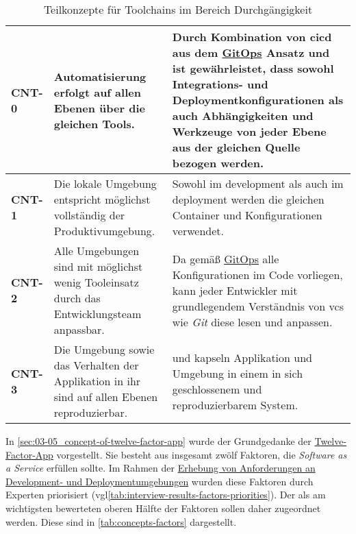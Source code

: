 \begin{table}[H]
    \begin{tabular}{ >{\bfseries\ttfamily}p{} >{}p{} | >{}p{} }
        CNT-0   &   Automatisierung erfolgt auf allen Ebenen über die gleichen Tools. &
        Durch Kombination von \Gls{cicd} aus dem \hyperref[sec:03-03_gitops]{GitOps} Ansatz und \nameref{sec:02-03_containerization} ist gewährleistet, dass sowohl Integrations- und Deploymentkonfigurationen als auch Abhängigkeiten und Werkzeuge von jeder Ebene aus der gleichen Quelle bezogen werden. \\
        \hline
        CNT-1   &   Die lokale Umgebung entspricht möglichst vollständig der Produktivumgebung. &
        Sowohl im \Gls{development} als auch im \Gls{deployment} werden die gleichen Container und Konfigurationen verwendet. \\
        \hline
        CNT-2   &   Alle Umgebungen sind mit möglichst wenig Tooleinsatz durch das Entwicklungsteam anpassbar. &
        Da gemäß \hyperref[sec:03-03_gitops]{GitOps} alle Konfigurationen im Code vorliegen, kann jeder Entwickler mit grundlegendem Verständnis von \Gls{vcs} wie \textit{Git} diese lesen und anpassen. \\
        \hline
        CNT-3   &   Die Umgebung sowie das Verhalten der Applikation in ihr sind auf allen Ebenen reproduzierbar. &
        \nameref{subsec:05-01-01_docker-container} und \nameref{subsec:05-01-02_dev-container} kapseln Applikation und Umgebung in einem in sich geschlossenem und reproduzierbarem System. \\
    \end{tabular}
    \caption{Teilkonzepte für Toolchains im Bereich Durchgängigkeit}
    \label{tab:concepts-continuity}
\end{table}

In \autoref{sec:03-05_concept-of-twelve-factor-app} wurde der Grundgedanke der \hyperref[sec:03-05_concept-of-twelve-factor-app]{Twelve-Factor-App} vorgestellt. Sie besteht aus insgesamt zwölf Faktoren, die \textit{Software as a Service} erfüllen sollte. Im Rahmen der \hyperref[sec:04-01_collection-of-requirements-using-expert-interviews]{Erhebung von Anforderungen an Development- und Deploymentumgebungen} wurden diese Faktoren durch Experten priorisiert (\acrshort{vgl}\autoref{tab:interview-results-factors-priorities}). Der als am wichtigsten bewerteten oberen Hälfte der Faktoren sollen daher  zugeordnet werden. Diese sind in \autoref{tab:concepts-factors} dargestellt.

